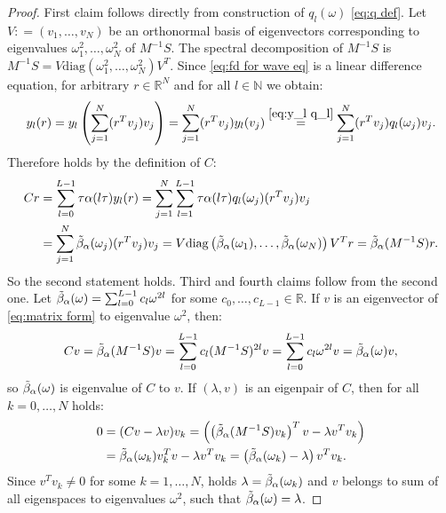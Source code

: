 \documentclass[a4paper,11pt,bibliography=totoc,listof=totoc,headinclude=true,cleardoublepage=empty,oneside]{scrbook}
\newcommand{\R}{\mathbb{R}}
\newcommand{\N}{\mathbb{N}}
\newcommand{\dff}{\Tilde{\beta}_\alpha}
\begin{document}
\begin{proof}
    First claim follows directly from construction of $q_l(\omega)$ \eqref{eq:q def}. Let $V: = (v_1, \dots, v_N)$ be an orthonormal basis of eigenvectors corresponding to eigenvalues $\omega_1^2, \dots, \omega_N^2$ of $M^{-1}S$. The spectral decomposition of $M^{-1}S$ is $M^{-1}S = V \mathrm{diag}(\omega_1^2, \dots, \omega_N^2) V^T$. Since \eqref{eq:fd for wave eq} is a linear difference equation, for arbitrary $r\in\R^N$ and for all $l\in \N$ we obtain:
    \begin{equation*}
        y_l(r) = y_l \left( \sum_{j=1}^N (r^T v_j)v_j \right) = \sum_{j=1}^N (r^T v_j)y_l(v_j) \stackrel{\eqref{eq:y_l q_l}}{=} \sum_{j=1}^N (r^T v_j)q_l(\omega_j)v_j.
    \end{equation*}
    Therefore holds by the definition of $C$:
    \begin{align*}
        Cr &= \sum_{l=0}^{L-1} \tau\alpha(l\tau) y_l(r) = \sum_{j=1}^N \sum_{l=1}^{L-1} \tau\alpha(l\tau)q_l(\omega_j) (r^T v_j) v_j \\ &= \sum_{j=1}^{N}\dff(\omega_j)(r^Tv_j)v_j = V \mathrm{diag}\left(\dff(\omega_1), \dots, \dff(\omega_N)\right)V^Tr = \dff(M^{-1} S)r.
    \end{align*}
    So the second statement holds. Third and fourth claims follow from the second one. Let $\dff(\omega) = \sum_{l=0}^{L-1} c_l \omega^{2l}$ for some $c_0, \dots, c_{L-1}\in \R$. If $v$ is an eigenvector of \eqref{eq:matrix form} to eigenvalue $\omega^2$, then:
    \begin{equation*}
        Cv = \dff(M^{-1}S)v = \sum_{l=0}^{L-1} c_l (M^{-1}S)^{2l}v = \sum_{l=0}^{L-1} c_l \omega^{2l}v = \dff(\omega)v,
    \end{equation*}
    so $\dff(\omega)$ is eigenvalue of $C$ to $v$. If $(\lambda, v)$ is an eigenpair of $C$, then for all $k=0,\dots, N$ holds:
    \begin{align*}
        0 &= (Cv - \lambda v)v_k = \left(\left(\dff(M^{-1}S)v_k\right)^Tv - \lambda v^T v_k\right) \\&= \dff(\omega_k)v_k^T v - \lambda v^T v_k = \left(\dff(\omega_k) - \lambda\right)v^T v_k.
    \end{align*}
    Since $v^Tv_k \neq 0$ for some $k=1, \dots, N$, holds $\lambda = \dff(\omega_k)$ and $v$ belongs to sum of all eigenspaces to eigenvalues $\omega^2$, such that $\dff(\omega) = \lambda$.
\end{proof}
\end{document}
